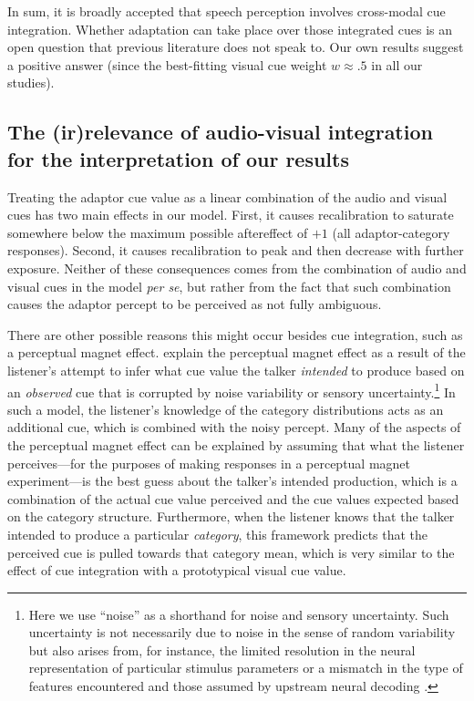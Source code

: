 In sum, it is broadly accepted that speech perception involves cross-modal cue integration. Whether adaptation can take place over those integrated cues is an open question that previous literature does not speak to. Our own results suggest a positive answer (since the best-fitting visual cue weight $w \approx .5$ in all our studies). 


\subsection{The (ir)relevance of audio-visual integration for the interpretation of our results}
\label{sec:import-audio-visu}

Treating the adaptor cue value as a linear combination of the audio and visual cues has two main effects in our model.  First, it causes recalibration to saturate somewhere below the maximum possible aftereffect of $+1$ (all adaptor-category responses).  Second, it causes recalibration to peak and then decrease with further exposure.  Neither of these consequences comes from the combination of audio and visual cues in the model \emph{per se}, but rather from the fact that such combination causes the adaptor percept to be perceived as not fully ambiguous.

There are other possible reasons this might occur besides cue integration, such as a perceptual magnet effect.  \textcite{Feldman2009a} explain the perceptual magnet effect as a result of the listener's attempt to infer what cue value the talker \emph{intended} to produce based on an \emph{observed} cue that is corrupted by noise variability or sensory uncertainty.\footnote{Here we use ``noise'' as a shorthand for noise and sensory uncertainty.  Such uncertainty is not necessarily due to noise in the sense of random variability but also arises from, for instance, the limited resolution in the neural representation of particular stimulus parameters or a mismatch in the type of features encountered and those assumed by upstream neural decoding \protect\autocite{Beck2012}.}  In such a model, the listener's knowledge of the category distributions acts as an additional cue, which is combined with the noisy percept.  Many of the aspects of the perceptual magnet effect can be explained by assuming that what the listener perceives---for the purposes of making responses in a perceptual magnet experiment---is the best guess about the talker's intended production, which is a combination of the actual cue value perceived and the cue values expected based on the category structure.  Furthermore, when the listener knows that the talker intended to produce a particular \emph{category}, this framework predicts that the perceived cue is pulled towards that category mean, which is very similar to the effect of cue integration with a prototypical visual cue value.

